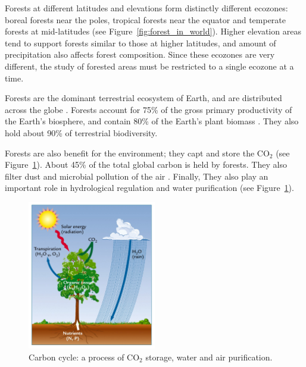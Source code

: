 Forests at different latitudes and elevations form distinctly different ecozones: boreal forests near the poles, tropical forests near the equator and temperate forests at mid-latitudes (see Figure~\ref{fig:forest_in_world}). Higher elevation areas tend to support forests similar to those at higher latitudes, and amount of precipitation also affects forest composition. Since these ecozones are very different, the study of forested areas must be restricted to a single ecozone at a time.

Forests are the dominant terrestrial ecosystem of Earth, and are distributed across the globe \citep{pan2013structure}. Forests account for 75\% of the gross primary productivity of the Earth's biosphere, and contain 80\% of the Earth's plant biomass \citep{pan2013structure}. They also hold about 90\% of terrestrial biodiversity.

Forests are also benefit for the environment; they capt and store the CO$_{2}$ \citep{fahey2010forest} (see Figure~\ref{fig:carbon_cycle}). About 45\% of the total global carbon is held by forests. They also filter dust and microbial pollution of the air \citep{smith2012air}. Finally, They also play an important role in hydrological regulation and water purification \citep{lempriere2008importance} (see Figure~\ref{fig:carbon_cycle}).

\begin{figure}[htbp]
\begin{center}
\includegraphics[width=0.5\textwidth]{Figures/carbon_cycle}
\caption{Carbon cycle: a process of CO$_{2}$ storage, water and air purification.}
\label{fig:carbon_cycle}
\end{center}
\end{figure}

